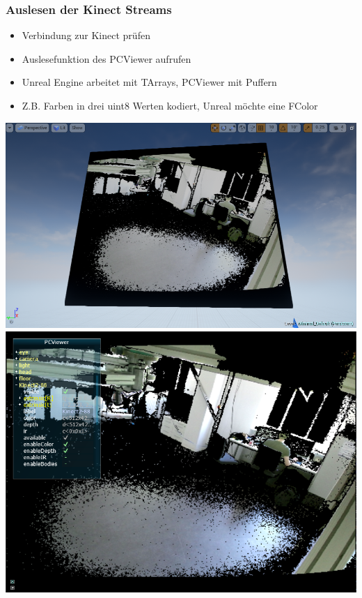 \documentclass[18pt]{beamer}
\begin{document}
\begin{frame}
	\frametitle{Auslesen der Kinect Streams} 
	\begin{itemize}
		\item Verbindung zur Kinect prüfen
		\item Auslesefunktion des PCViewer aufrufen
		\item Unreal Engine arbeitet mit TArrays, PCViewer mit Puffern
		\item Z.B. Farben in drei uint8 Werten kodiert, Unreal möchte eine FColor
	\end{itemize}
	\begin{center}
		\includegraphics[height=0.4\paperheight]{img/2DColor}
		\includegraphics[height=0.4\paperheight]{img/2DColorPCViewer}
	\end{center}
\end{frame}
\end{document}
